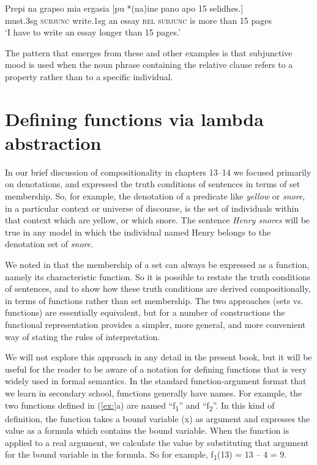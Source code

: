 \ea
\gll Prepi  na  grapso  mia  ergasia  [pu  *(na)\footnotemark  ine  pano  apo  15  selidhes.]\\
must.3sg  \textsc{subjunc}  write.1sg  an  essay  \textsc{rel}  \textsc{subjunc}  is  more  than  15  pages\\
\glt ‘I have to write an essay longer than 15 pages.’\\
\z
{}

The pattern that emerges from these and other examples is that subjunctive mood is used when the noun phrase containing the relative clause refers to a property rather than to a specific individual.


\section{Defining functions via lambda abstraction}\label{sec:} %

In our brief discussion of compositionality in chapters 13–14 we focused primarily on denotations, and expressed the truth conditions of sentences in terms of set membership. So, for example, the denotation of a predicate like \textit{yellow} or \textit{snore}, in a particular context or universe of discourse, is the set of individuals within that context which are yellow, or which snore. The sentence \textit{Henry snores} will be true in any model in which the individual named Henry belongs to the denotation set of \textit{snore}.



We noted in  that the membership of a set can always be expressed as a function, namely its characteristic function. So it is possible to restate the truth conditions of sentences, and to show how these truth conditions are derived compositionally, in terms of functions rather than set membership. The two approaches (sets vs. functions) are essentially equivalent, but for a number of constructions the functional representation provides a simpler, more general, and more convenient way of stating the rules of interpretation.



We will not explore this approach in any detail in the present book, but it will be useful for the reader to be aware of a notation for defining functions that is very widely used in formal semantics. In the standard function-argument format that we learn in secondary school, functions generally have names. For example, the two functions defined in (\ref{ex:}a) are named “f\textsubscript{1}” and “f\textsubscript{2}”. In this kind of definition, the function takes a bound variable (x) as argument and expresses the value as a formula which contains the bound variable. When the function is applied to a real argument, we calculate the value by substituting that argument for the bound variable in the formula. So for example, f\textsubscript{1}(13) = 13 – 4 = 9.


